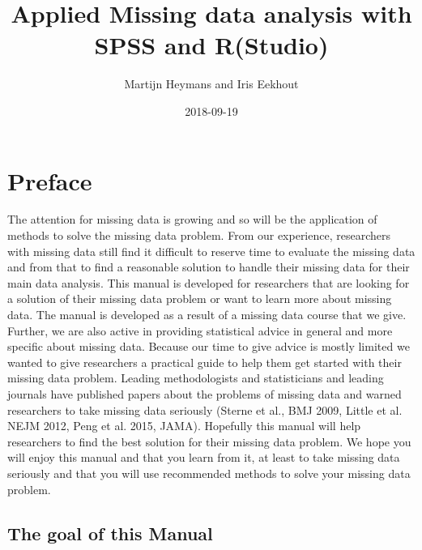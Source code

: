\documentclass[]{book}
\title{Applied Missing data analysis with SPSS and R(Studio)}
\author{Martijn Heymans and Iris Eekhout}
\date{2018-09-19}
\begin{document}
\maketitle

{
\setcounter{tocdepth}{1}
\tableofcontents
}
\chapter*{Preface}\label{preface}

The attention for missing data is growing and so will be the application
of methods to solve the missing data problem. From our experience,
researchers with missing data still find it difficult to reserve time to
evaluate the missing data and from that to find a reasonable solution to
handle their missing data for their main data analysis. This manual is
developed for researchers that are looking for a solution of their
missing data problem or want to learn more about missing data. The
manual is developed as a result of a missing data course that we give.
Further, we are also active in providing statistical advice in general
and more specific about missing data. Because our time to give advice is
mostly limited we wanted to give researchers a practical guide to help
them get started with their missing data problem. Leading methodologists
and statisticians and leading journals have published papers about the
problems of missing data and warned researchers to take missing data
seriously (Sterne et al., BMJ 2009, Little et al. NEJM 2012, Peng et al.
2015, JAMA). Hopefully this manual will help researchers to find the
best solution for their missing data problem. We hope you will enjoy
this manual and that you learn from it, at least to take missing data
seriously and that you will use recommended methods to solve your
missing data problem.

\section{The goal of this Manual}\label{the-goal-of-this-manual}
\end{document}
